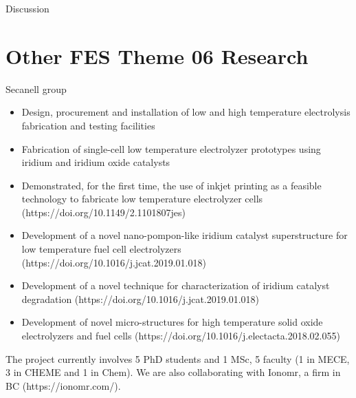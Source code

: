 \documentclass{beamer}
\begin{document}
\begin{frame}{Discussion}
   \vfill
\end{frame}


\section{Other FES Theme 06 Research}
\begin{frame} Secanell group
\begin{block}{}
\footnotesize{\begin{itemize}
  \item Design, procurement and installation of low and high temperature electrolysis fabrication and testing facilities
  \item Fabrication of single-cell low temperature electrolyzer prototypes using iridium and iridium oxide catalysts
  \item Demonstrated, for the first time, the use of inkjet printing as a feasible technology to fabricate low temperature electrolyzer cells  (https://doi.org/10.1149/2.1101807jes)
   \item Development of a novel nano-pompon-like iridium catalyst superstructure for low temperature fuel cell electrolyzers (https://doi.org/10.1016/j.jcat.2019.01.018)
   \item Development of a novel technique for characterization of iridium catalyst degradation (https://doi.org/10.1016/j.jcat.2019.01.018)
 \item Development of novel micro-structures for high temperature solid oxide electrolyzers and fuel cells (https://doi.org/10.1016/j.electacta.2018.02.055)
  \end{itemize}}
The project currently involves 5 PhD students and 1 MSc, 5 faculty (1 in MECE, 3 in CHEME and 1 in Chem). We are also collaborating with Ionomr, a firm in BC (https://ionomr.com/).
  \end{block}
   \vfill
\end{frame}
\end{document}
